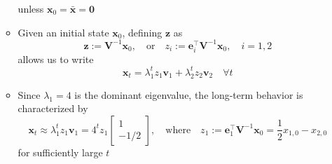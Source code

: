\documentclass[12pt,a4paper]{article}
\begin{document}
\begin{itemize}
\begin{itemize}
    unless $\bm{x}_{0} = \bar{\bm{x}}=\bm{0}$
    \item Given an initial state $\bm{x}_{0}$,
      defining $\bm{z}$ as
      \begin{equation}\nonumber%
        \bm{z} := \bm{V}^{-1}\bm{x}_{0},
        \quad\text{or}\quad
        z_{i} := \bm{e}_{i}^{\top}\bm{V}^{-1}\bm{x}_{0},
        \quad i = 1, 2
      \end{equation}
      allows us to write
    \begin{equation}\nonumber%
      \bm{x}_{t}
      =
      \lambda_{1}^{t}z_{1}\bm{v}_{1}
      +
      \lambda_{2}^{t}z_{2}\bm{v}_{2}
      \quad \forall t
    \end{equation}
    \item Since $\lambda_{1}=4$ is the dominant eigenvalue,
      the long-term behavior is characterized by
    \begin{equation}\nonumber%
      \bm{x}_{t}
      \approx
      \lambda_{1}^{t}z_{1}\bm{v}_{1}
      =
      4^{t}z_{1}
      \begin{bmatrix}
        1 \\ -1/2
      \end{bmatrix},
      \quad\text{where}\quad
      z_{1}:=\bm{e}_{1}^{\top}\bm{V}^{-1}\bm{x}_{0}
      = \frac{1}{2}x_{1,0} - x_{2,0}
    \end{equation}
    for sufficiently large $t$
  \end{itemize}

\end{itemize}
\end{document}
